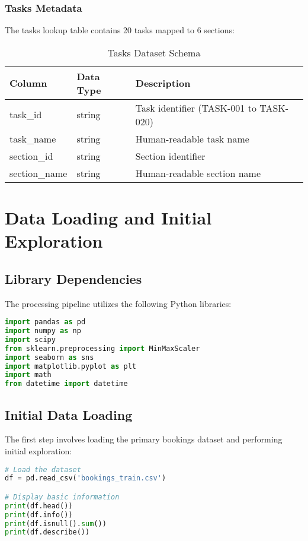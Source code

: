 \documentclass[12pt,a4paper]{article}
\begin{document}
\subsubsection{Tasks Metadata}

The tasks lookup table contains 20 tasks mapped to 6 sections:

\begin{table}[H]
\centering
\caption{Tasks Dataset Schema}
\begin{tabular}{@{}lll@{}}
\toprule
\textbf{Column} & \textbf{Data Type} & \textbf{Description} \\
\midrule
task\_id & string & Task identifier (TASK-001 to TASK-020) \\
task\_name & string & Human-readable task name \\
section\_id & string & Section identifier \\
section\_name & string & Human-readable section name \\
\bottomrule
\end{tabular}
\end{table}

\section{Data Loading and Initial Exploration}

\subsection{Library Dependencies}

The processing pipeline utilizes the following Python libraries:

\begin{lstlisting}[language=Python, caption=Required Python Libraries]
import pandas as pd
import numpy as np
import scipy
from sklearn.preprocessing import MinMaxScaler
import seaborn as sns
import matplotlib.pyplot as plt
import math
from datetime import datetime
\end{lstlisting}

\subsection{Initial Data Loading}

The first step involves loading the primary bookings dataset and performing initial exploration:

\begin{lstlisting}[language=Python, caption=Initial Data Loading]
# Load the dataset
df = pd.read_csv('bookings_train.csv')

# Display basic information
print(df.head())
print(df.info())
print(df.isnull().sum())
print(df.describe())
\end{lstlisting}
\end{document}
